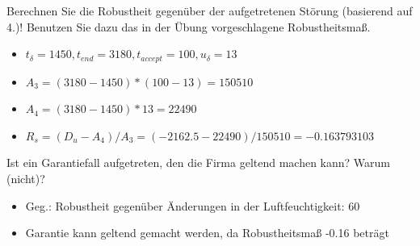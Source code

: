 \documentclass{ocbeameruni}
\begin{document}
\begin{frame}{3.5}
Berechnen Sie die Robustheit gegenüber der aufgetretenen Störung (basierend auf 4.)! Benutzen
Sie dazu das in der Übung vorgeschlagene Robustheitsmaß.
    \begin{itemize}
    \item $t_{\delta} = 1450, t_{end} = 3180, t_{accept} = 100, u_{\delta} = 13$
    \item $A_3 = (3180-1450) * (100-13) = 150510$
    \item $A_4 = (3180-1450) * 13 = 22490$
    \item $R_s = (D_u - A_4) / A_3 = (-2162.5 - 22490) / 150510 = -0.163793103$
    \end{itemize}
\end{frame}

\begin{frame}{3.6}
Ist ein Garantiefall aufgetreten, den die Firma geltend machen kann? Warum (nicht)?
    \begin{itemize}
    \item Geg.: Robustheit gegenüber Änderungen in der Luftfeuchtigkeit: 60 %
    \item Garantie kann geltend gemacht werden, da Robustheitsmaß -0.16 beträgt
    \end{itemize}
\end{frame}
\end{document}
